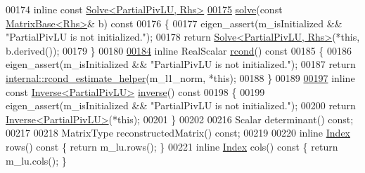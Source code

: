 \begin{DoxyCode}
00174     \textcolor{keyword}{inline} \textcolor{keyword}{const} \hyperlink{group___core___module_class_eigen_1_1_solve}{Solve<PartialPivLU, Rhs>}
\hyperlink{group___l_u___module_a49247bd2f742a46bca1f9c2bf1b19ad8}{00175}     \hyperlink{group___l_u___module_a49247bd2f742a46bca1f9c2bf1b19ad8}{solve}(\textcolor{keyword}{const} \hyperlink{group___core___module_class_eigen_1_1_matrix_base}{MatrixBase<Rhs>}& b)\textcolor{keyword}{ const}
00176 \textcolor{keyword}{    }\{
00177       eigen\_assert(m\_isInitialized && \textcolor{stringliteral}{"PartialPivLU is not initialized."});
00178       \textcolor{keywordflow}{return} \hyperlink{group___core___module_class_eigen_1_1_solve}{Solve<PartialPivLU, Rhs>}(*\textcolor{keyword}{this}, b.derived());
00179     \}
00180 
\hyperlink{group___l_u___module_a472b46d5d9ff7c328e1dccc13805f690}{00184}     \textcolor{keyword}{inline} RealScalar \hyperlink{group___l_u___module_a472b46d5d9ff7c328e1dccc13805f690}{rcond}()\textcolor{keyword}{ const}
00185 \textcolor{keyword}{    }\{
00186       eigen\_assert(m\_isInitialized && \textcolor{stringliteral}{"PartialPivLU is not initialized."});
00187       \textcolor{keywordflow}{return} \hyperlink{namespace_eigen_1_1internal_ad1de0d785387bfb5435c410bf0554068}{internal::rcond\_estimate\_helper}(m\_l1\_norm, *\textcolor{keyword}{this});
00188     \}
00189 
\hyperlink{group___l_u___module_aef983470f92aba829e861e32e68681b5}{00197}     \textcolor{keyword}{inline} \textcolor{keyword}{const} \hyperlink{class_eigen_1_1_inverse}{Inverse<PartialPivLU>} \hyperlink{group___l_u___module_aef983470f92aba829e861e32e68681b5}{inverse}()\textcolor{keyword}{ const}
00198 \textcolor{keyword}{    }\{
00199       eigen\_assert(m\_isInitialized && \textcolor{stringliteral}{"PartialPivLU is not initialized."});
00200       \textcolor{keywordflow}{return} \hyperlink{class_eigen_1_1_inverse}{Inverse<PartialPivLU>}(*this);
00201     \}
00202 
00216     Scalar determinant() \textcolor{keyword}{const};
00217 
00218     MatrixType reconstructedMatrix() \textcolor{keyword}{const};
00219 
00220     \textcolor{keyword}{inline} \hyperlink{group___core___module_a554f30542cc2316add4b1ea0a492ff02}{Index} rows()\textcolor{keyword}{ const }\{ \textcolor{keywordflow}{return} m\_lu.rows(); \}
00221     \textcolor{keyword}{inline} \hyperlink{group___core___module_a554f30542cc2316add4b1ea0a492ff02}{Index} cols()\textcolor{keyword}{ const }\{ \textcolor{keywordflow}{return} m\_lu.cols(); \}

\end{DoxyCode}
